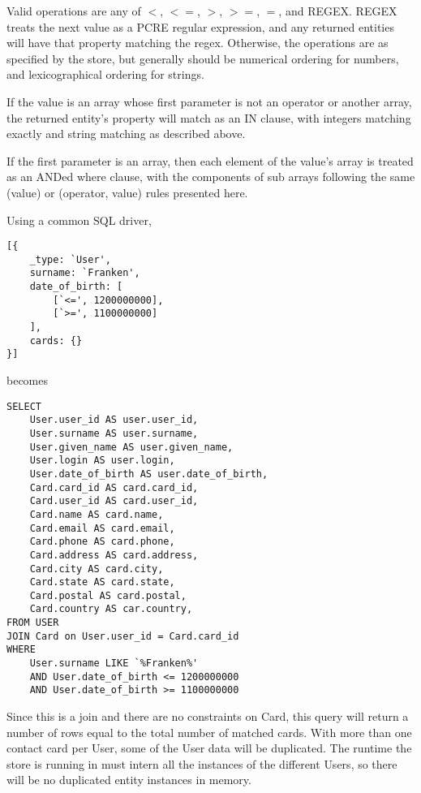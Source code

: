 \documentclass{article}
\begin{document}
Valid operations are any of {\ilcode $<$}, {\ilcode $<=$}, {\ilcode $>$},
{\ilcode $>=$}, {\ilcode $=$}, and {\ilcode REGEX}. {\ilcode REGEX} treats the
next value as a PCRE regular expression, and any returned entities will have
that property matching the regex. Otherwise, the operations are as specified by
the store, but generally should be numerical ordering for numbers, and
lexicographical ordering for strings.



If the value is an array whose first parameter is not an operator or another
array, the returned entity's property will match as an IN clause, with integers
matching exactly and string matching as described above.

If the first parameter is an array, then each element of the value's array is
treated as an ANDed where clause, with the components of sub arrays following
the same (value) or (operator, value) rules presented here.

Using a common SQL driver,
\linespread{1}
\begin{lstlisting}
[{
	_type: `User',
	surname: `Franken',
	date_of_birth: [
		[`<=', 1200000000],
		[`>=', 1100000000]
	],
	cards: {}
}]
\end{lstlisting}
\linespread{1.6}

becomes

\linespread{1}
\lstset{language=SQL}
\begin{lstlisting}
SELECT
	User.user_id AS user.user_id,
	User.surname AS user.surname,
	User.given_name AS user.given_name,
	User.login AS user.login,
	User.date_of_birth AS user.date_of_birth,
	Card.card_id AS card.card_id,
	Card.user_id AS card.user_id,
	Card.name AS card.name,
	Card.email AS card.email,
	Card.phone AS card.phone,
	Card.address AS card.address,
	Card.city AS card.city,
	Card.state AS card.state,
	Card.postal AS card.postal,
	Card.country AS car.country,
FROM USER
JOIN Card on User.user_id = Card.card_id
WHERE
	User.surname LIKE `%Franken%'
	AND User.date_of_birth <= 1200000000
	AND User.date_of_birth >= 1100000000
\end{lstlisting}
\lstset{language=JavaScript}
\linespread{1.6}

Since this is a join and there are no constraints on {\ilcode Card}, this
query will return a number of rows equal to the total number of matched cards.
With more than one contact card per {\ilcode User}, some of the User data will
be duplicated. The runtime the store is running in must intern all the instances
of the different {\ilcode Users}, so there will be no duplicated entity
instances in memory.
\end{document}
